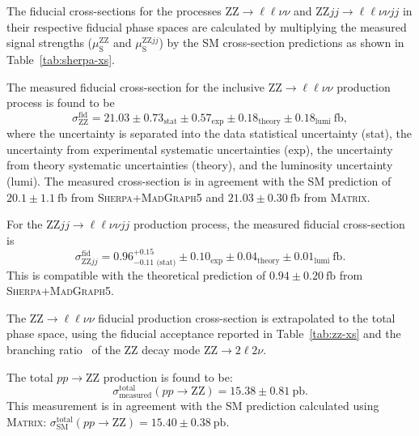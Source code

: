 The fiducial cross-sections for the processes $\text{ZZ} \to \ell\ell\nu\nu$ and $\text{ZZ}jj \to \ell\ell\nu\nu jj$ in their respective fiducial phase spaces are calculated by multiplying the measured signal strengths ($\mu_{\text{S}}^{\text{ZZ}}$ and $\mu_{\text{S}}^{\text{ZZ}jj}$) by the SM cross-section predictions as shown in Table~\ref{tab:sherpa-xs}.

The measured fiducial cross-section for the inclusive $\text{ZZ} \to \ell\ell\nu\nu$ production process is found to be
\begin{equation*}
\sigma_{\text{ZZ}}^{\text{fid}} = 21.03 \pm 0.73_{\text{stat}} \pm 0.57_{\text{exp}} \pm 0.18_{\text{theory}} \pm 0.18_{\text{lumi}}~\text{fb},
\end{equation*} 
where the uncertainty is separated into the data statistical uncertainty (stat), the uncertainty from experimental systematic uncertainties (exp), the uncertainty from theory systematic uncertainties (theory), and the luminosity uncertainty (lumi). 
The measured cross-section is in agreement with the SM prediction of $20.1 \pm 1.1~\text{fb}$ from \textsc{Sherpa}+\textsc{MadGraph5} and $21.03 \pm 0.30~\text{fb}$ from \textsc{Matrix}. 

For the $\text{ZZ}jj \to \ell\ell\nu\nu jj$ production process, the measured fiducial cross-section is 
\begin{equation*}
\sigma_{\text{ZZ}jj}^{\text{fid}} = 0.96^{+0.15}_{-0.11\text{ (stat)}} \pm 0.10_{\text{exp}} \pm 0.04_{\text{theory}} \pm 0.01_{\text{lumi}}~\text{fb}.
\end{equation*}
This is compatible with the theoretical prediction of $0.94 \pm 0.20~\text{fb}$ from \textsc{Sherpa}+\textsc{MadGraph5}. 

The $\text{ZZ} \to \ell\ell\nu\nu$ fiducial production cross-section is extrapolated to the total phase space, using the fiducial acceptance reported in Table~\ref{tab:zz-xs} and the branching ratio~\cite{Zyla:2020zbs} of the $\text{ZZ}$ decay mode $\text{ZZ} \to 2\ell 2\nu$. 

The total $pp \to \text{ZZ}$ production is found to be:
\begin{equation*}
\sigma^{\text{total}}_{\text{measured}}(pp \to \text{ZZ}) = 15.38 \pm 0.81~\text{pb}.
\end{equation*}
This measurement is in agreement with the SM prediction calculated using \textsc{Matrix}: $\sigma^{\text{total}}_{\text{SM}}(pp \to \text{ZZ}) = 15.40 \pm 0.38~\text{pb}$.


